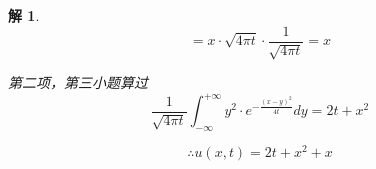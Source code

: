 \documentclass[12pt,a4paper]{article}
\newtheorem*{solution}{解}
\begin{document}
\begin{solution}
\begin{equation*}
	= x \cdot \sqrt{4\pi t} \cdot \frac{1}{\sqrt{4\pi t}} = x
\end{equation*}


第二项，第三小题算过
\begin{equation*}
\frac{1}{\sqrt{4\pi t}}\int_{-\infty}^{+\infty} y^2 \cdot e^{-\frac{(x-y)^2}{4t}} dy=2t+x^2
\end{equation*}



\begin{equation*}
	\therefore u(x,t) = 2t + x^2 + x
\end{equation*}

	
	
\end{solution}
\end{document}
